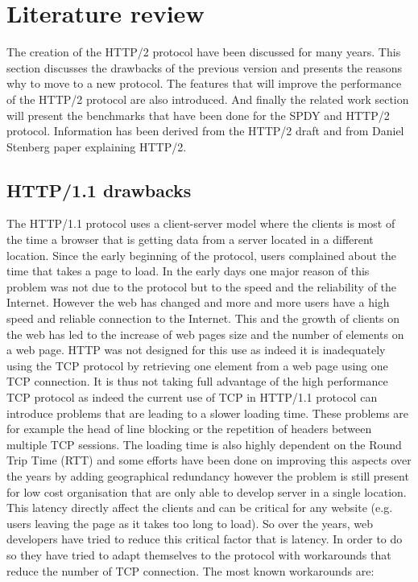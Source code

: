 \section{Literature review}
\label{relwork}
The creation of the HTTP/2 protocol have been discussed for many years. This section discusses the drawbacks of the previous version and presents the reasons why to move to a new protocol. The features that will improve the performance of the HTTP/2 protocol are also introduced. And finally the related work section will present the benchmarks that have been done for the SPDY and HTTP/2 protocol. Information has been derived from the HTTP/2 draft\cite{http2} and from Daniel Stenberg paper explaining HTTP/2\cite{stenberg}. 

\subsection{HTTP/1.1 drawbacks}
The HTTP/1.1 protocol uses a client-server model where the clients is most of the time a browser that is getting data from a server located in a different location. Since the early beginning of the protocol, users complained about the time that takes a page to load. In the early days one major reason of this problem was not due to the protocol but to the speed and the reliability of the Internet. However the web has changed and more and more users have a high speed and reliable connection to the Internet. This and the growth of clients on the web has led to the increase of web pages size and the number of elements on a web page. HTTP was not designed for this use as indeed it is inadequately using the TCP protocol by retrieving one element from a web page using one TCP connection. It is thus not taking full advantage of the high performance TCP protocol as indeed the current use of TCP in HTTP/1.1 protocol can introduce problems that are leading to a slower loading time. These problems are for example the head of line blocking or the repetition of headers between multiple TCP sessions. The loading time is also highly dependent on the Round Trip Time (RTT) and some efforts have been done on improving this aspects over the years by adding geographical redundancy however the problem is still present for low cost organisation that are only able to develop server in a single location. 
This latency directly affect the clients and can be critical for any website (e.g. users leaving the page as it takes too long to load). So over the years, web developers have tried to reduce this critical factor that is latency. In order to do so they have tried to adapt themselves to the protocol with workarounds that reduce the number of TCP connection. The most known workarounds are:
